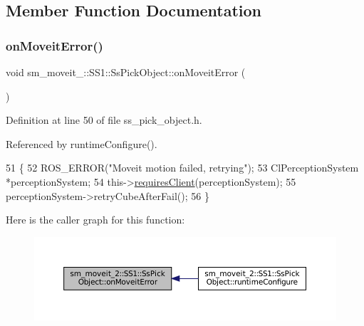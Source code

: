 \subsection{Member Function Documentation}
\mbox{\label{structsm__moveit__2_1_1SS1_1_1SsPickObject_af87168e32fc8acb369f87f2ce438bd29}} 
\subsubsection{\texorpdfstring{on\+Moveit\+Error()}{onMoveitError()}}
{\footnotesize\ttfamily void sm\+\_\+moveit\+\_\+::\+S\+S1\+::\+Ss\+Pick\+Object\+::on\+Moveit\+Error (\begin{DoxyParamCaption}{ }\end{DoxyParamCaption})\hspace{0.3cm}{\ttfamily [inline]}}



Definition at line 50 of file ss\+\_\+pick\+\_\+object.\+h.



Referenced by runtime\+Configure().


\begin{DoxyCode}
51     \{
52         ROS\_ERROR(\textcolor{stringliteral}{"Moveit motion failed, retrying"});
53         ClPerceptionSystem *perceptionSystem;
54         this->\hyperlink{classsmacc_1_1ISmaccState_a7f95c9f0a6ea2d6f18d1aec0519de4ac}{requiresClient}(perceptionSystem);
55         perceptionSystem->retryCubeAfterFail();
56     \}
\end{DoxyCode}
Here is the caller graph for this function\+:
\nopagebreak
\begin{figure}[H]
\begin{center}
\leavevmode
\includegraphics[width=350pt]{structsm__moveit__2_1_1SS1_1_1SsPickObject_af87168e32fc8acb369f87f2ce438bd29_icgraph}
\end{center}
\end{figure}
\mbox{\label{structsm__moveit__2_1_1SS1_1_1SsPickObject_a7545dc96063c5a0930d671c973b13f6e}} 

